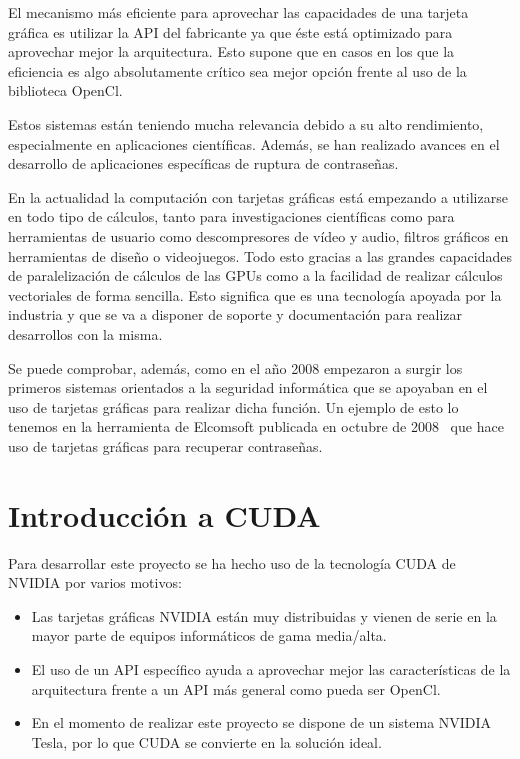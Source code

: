 El mecanismo más eficiente para aprovechar las capacidades de una tarjeta gráfica es utilizar la API del fabricante ya que éste está optimizado para aprovechar mejor la arquitectura. Esto supone que en casos en los que la eficiencia es algo absolutamente crítico sea mejor opción frente al uso de la biblioteca OpenCl.

Estos sistemas están teniendo mucha relevancia debido a su alto rendimiento, especialmente en aplicaciones científicas. Además, se han realizado avances en el desarrollo de aplicaciones específicas de ruptura de contraseñas.

En la actualidad la computación con tarjetas gráficas está empezando a utilizarse en todo tipo de cálculos, tanto para investigaciones científicas  como para herramientas de usuario como descompresores de vídeo y audio, filtros gráficos en herramientas de diseño o videojuegos. Todo esto gracias a las grandes capacidades de paralelización de cálculos de las GPUs como a la facilidad de realizar cálculos vectoriales de forma sencilla. Esto significa que es una tecnología apoyada por la industria y que se va a disponer de soporte y documentación para realizar desarrollos con la misma.

Se puede comprobar, además, como en el año 2008 empezaron a surgir los primeros sistemas orientados a la seguridad informática que se apoyaban en el uso de tarjetas gráficas para realizar dicha función. Un ejemplo de esto lo tenemos en la herramienta de Elcomsoft publicada en octubre de 2008~\cite{website:elcomsoft_press} que hace uso de tarjetas gráficas para recuperar contraseñas.

\section{Introducción a CUDA}

Para desarrollar este proyecto se ha hecho uso de la tecnología CUDA de NVIDIA por varios motivos:
\begin{itemize}
	\item Las tarjetas gráficas NVIDIA están muy distribuidas y vienen de serie en la mayor parte de equipos informáticos de gama media/alta.

	\item El uso de un API específico ayuda a aprovechar mejor las características de la arquitectura frente a un API más general como pueda ser OpenCl.

	\item En el momento de realizar este proyecto se dispone de un sistema NVIDIA Tesla, por lo que CUDA se convierte en la solución ideal.
\end{itemize}

